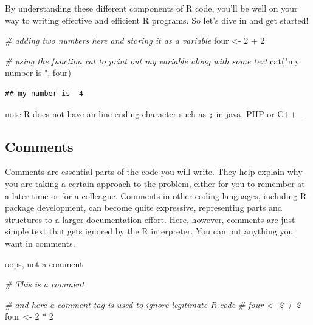 \documentclass[
]{book}
\newenvironment{Shaded}{\begin{snugshade}}{\end{snugshade}}
\newcommand{\CommentTok}[1]{\textcolor[rgb]{0.56,0.35,0.01}{\textit{#1}}}
\newcommand{\DecValTok}[1]{\textcolor[rgb]{0.00,0.00,0.81}{#1}}
\newcommand{\FunctionTok}[1]{\textcolor[rgb]{0.00,0.00,0.00}{#1}}
\newcommand{\NormalTok}[1]{#1}
\newcommand{\OtherTok}[1]{\textcolor[rgb]{0.56,0.35,0.01}{#1}}
\newcommand{\SpecialCharTok}[1]{\textcolor[rgb]{0.00,0.00,0.00}{#1}}
\newcommand{\StringTok}[1]{\textcolor[rgb]{0.31,0.60,0.02}{#1}}
\begin{document}
By understanding these different components of R code, you'll be well on your way to writing effective and efficient R programs. So let's dive in and get started!

\begin{Shaded}
\begin{Highlighting}[]
\CommentTok{\# adding two numbers here and storing it as a variable}
\NormalTok{four }\OtherTok{\textless{}{-}} \DecValTok{2} \SpecialCharTok{+} \DecValTok{2}

\CommentTok{\# using the function \textquotesingle{}cat\textquotesingle{} to print out my variable along with some text}
\FunctionTok{cat}\NormalTok{(}\StringTok{"my number is "}\NormalTok{, four)}
\end{Highlighting}
\end{Shaded}

\begin{verbatim}
## my number is  4
\end{verbatim}

\begin{infobox}{note}
R does not have an line ending character such as \texttt{;} in java, PHP or C++\_

\end{infobox}

\hypertarget{comments}{%
\subsection{Comments}\label{comments}}

Comments are essential parts of the code you will write. They help explain why you are taking a certain approach to the problem, either for you to remember at a later time or for a colleague. Comments in other coding languages, including R package development, can become quite expressive, representing parts and structures to a larger documentation effort. Here, however, comments are just simple text that gets ignored by the R interpreter. You can put anything you want in comments.

\begin{Shaded}
\begin{Highlighting}[]
\NormalTok{oops, not a comment}
\end{Highlighting}
\end{Shaded}

\begin{Shaded}
\begin{Highlighting}[]
\CommentTok{\# This is a comment}

\CommentTok{\# and here a comment tag is used to ignore legitimate R code}
\CommentTok{\# four \textless{}{-} 2 + 2 }
\NormalTok{four }\OtherTok{\textless{}{-}} \DecValTok{2} \SpecialCharTok{*} \DecValTok{2}
\end{Highlighting}
\end{Shaded}
\end{document}
